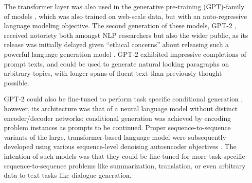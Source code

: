 The transformer layer was also used in the generative pre-training
(GPT)-family of models \citep{radford2018improving}, which was  also trained
on web-scale data, but with an auto-regressive language modeling objective.
The second generation of these models, GPT-2 \citep{radford2019language},
received notoriety both amongst NLP researchers but also the wider public, as
its release was initially delayed given ``ethical concerns'' about releasing
such a powerful language generation model \citep{vincent2019,seabrook2019}.
GPT-2 exhibited impressive completions of prompt texts, and could be used to 
generate natural looking paragraphs on arbitrary topics, with longer spans of
fluent text than previously thought possible. 
  
GPT-2 could also be fine-tuned to perform task specific conditional generation 
\citep{ziegler2019,golovanov2019}, however, its architecture was that of a
neural language model without distinct encoder/decoder networks; conditional
generation was achieved by encoding problem instances as prompts to be continued.
Proper sequence-to-sequence variants of the 
  large, transformer-based language model were subsequently developed
using various sequence-level denoising autoencoder objectives 
\citep{zhang2019,raffel2020, lewis2020}.
The intention of such models was that they could be fine-tuned for more
task-specific sequence-to-sequence problems like summarization, translation,
or even arbitrary data-to-text tasks like dialogue generation.

